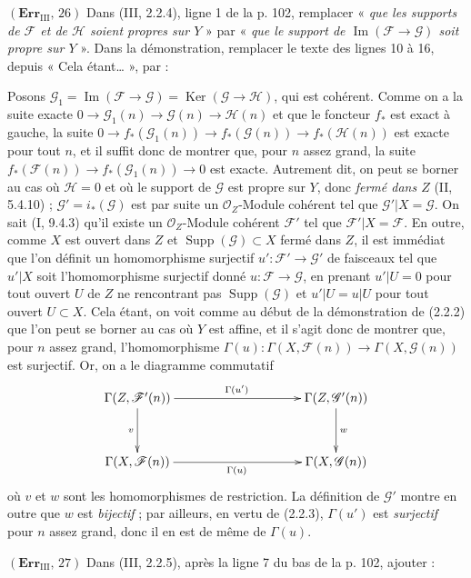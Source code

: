 \noindent\textbf{$(\mathbf{Err}_{\mathrm{III}},\,26)$} Dans (III, 2.2.4),
ligne 1 de la p. 102, remplacer « \emph{que les supports de $\mathscr F$ et de
$\mathscr H$ soient propres sur $Y$} » par « \emph{que le support de
$\operatorname{Im}(\mathscr F\to\mathscr G)$ soit propre sur $Y$} ». Dans la
démonstration, remplacer le texte des lignes 10 à 16, depuis « Cela
étant\ldots{} », par :

Posons
$\mathscr G_1=\operatorname{Im}(\mathscr F\to\mathscr G)
=\operatorname{Ker}(\mathscr G\to\mathscr H)$, qui est cohérent. Comme on a la
suite exacte
$0\to\mathscr G_1(n)\to\mathscr G(n)\to\mathscr H(n)$ et que le foncteur
$f_*$ est exact à gauche, la suite
$0\to f_*(\mathscr G_1(n))\to f_*(\mathscr G(n))\to f_*(\mathscr H(n))$ est
exacte pour tout $n$, et il suffit donc de montrer que, pour $n$ assez grand,
la suite $f_*(\mathscr F(n))\to f_*(\mathscr G_1(n))\to0$ est exacte. Autrement
dit, on peut se borner au cas où $\mathscr H=0$ et où le support de
$\mathscr G$ est propre sur $Y$, donc \emph{fermé dans $Z$} (II, 5.4.10) ;
$\mathscr G'=i_*(\mathscr G)$ est par suite un $\mathscr O_Z$-Module cohérent tel
que $\mathscr G'|X=\mathscr G$. On sait (I, 9.4.3) qu'il existe un
$\mathscr O_Z$-Module cohérent $\mathscr F'$ tel que
$\mathscr F'|X=\mathscr F$. En outre, comme $X$ est ouvert dans $Z$ et
$\operatorname{Supp}(\mathscr G)\subset X$ fermé dans $Z$, il est immédiat que
l'on définit un homomorphisme surjectif $u':\mathscr F'\to\mathscr G'$ de
faisceaux tel que $u'|X$ soit l'homomorphisme surjectif donné
$u:\mathscr F\to\mathscr G$, en prenant $u'|U=0$ pour tout ouvert $U$ de $Z$
ne rencontrant pas $\operatorname{Supp}(\mathscr G)$ et $u'|U=u|U$ pour tout
ouvert $U\subset X$. Cela étant, on voit comme au début de la démonstration de
(2.2.2) que l'on peut se borner au cas où $Y$ est affine, et il s'agit donc de
montrer que, pour $n$ assez grand, l'homomorphisme
$\Gamma(u):\Gamma(X,\mathscr F(n))\to\Gamma(X,\mathscr G(n))$ est surjectif. Or,
on a le diagramme commutatif
\[
\xymatrix@C=35mm@R=12mm{
\Gamma(Z,\mathscr F'(n)) \ar[r]^{\Gamma(u')} \ar[d]_v &
\Gamma(Z,\mathscr G'(n)) \ar[d]^w \\
\Gamma(X,\mathscr F(n)) \ar[r]_{\Gamma(u)} & \Gamma(X,\mathscr G(n))
}
\]
où $v$ et $w$ sont les homomorphismes de restriction. La définition de
$\mathscr G'$ montre en outre que $w$ est \emph{bijectif} ; par ailleurs, en
vertu de (2.2.3), $\Gamma(u')$ est \emph{surjectif} pour $n$ assez grand, donc
il en est de même de $\Gamma(u)$.

\noindent\textbf{$(\mathbf{Err}_{\mathrm{III}},\,27)$} Dans (III, 2.2.5),
après la ligne 7 du bas de la p. 102, ajouter :

